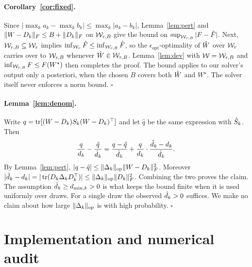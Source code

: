 \paragraph{Corollary~\ref{cor:fixed}.} Since $|\max_ka_k-\max_kb_k|\le\max_k|a_k-b_k|$,
Lemma~\ref{lem:pert} and $\lVert W-D_k\rVert_{F}\le B+\lVert D_k\rVert_{F}$ on $\mathcal{W}_{r,B}$ give the bound on
$\sup_{\mathcal{W}_{r,B}}|F-\hat{F}|$. Next, $\mathcal{W}_{r,B}\subseteq\mathcal{W}_r$ implies $\inf_{\mathcal{W}_r}\hat{F}\le\inf_{\mathcal{W}_{r,B}}\hat{F}$,
so the $\epsilon_{\mathrm{opt}}$-optimality of $\hat{W}$ over $\mathcal{W}_r$ carries over to $\mathcal{W}_{r,B}$ whenever
$\hat{W}\in\mathcal{W}_{r,B}$. Lemma~\ref{lem:dev} with $\mathcal W=\mathcal{W}_{r,B}$ and $\inf_{\mathcal{W}_{r,B}}F\le F(W^\star)$ then
completes the proof. The bound applies to our solver's output only a posteriori, when the chosen
$B$ covers both $\hat{W}$ and $W^\star$. The solver itself never enforces a norm bound.
\hfill$\square$

\paragraph{Lemma~\ref{lem:denom}.} Write $q=\operatorname{tr}[(W-D_k)S_k(W-D_k)^\top]$ and let $\hat q$ be the
same expression with $\hat{S}_k$. Then
\[
\frac{q}{d_k}-\frac{\hat q}{\hat{d}_k}=\frac{q-\hat q}{\hat{d}_k}+\frac{q}{d_k}\cdot
\frac{\hat{d}_k-d_k}{\hat{d}_k}.
\]
By Lemma~\ref{lem:pert}, $|q-\hat q|\le\lVert \Delta_k\rVert_{\mathrm{op}}\lVert W-D_k\rVert_{F}^2$. Moreover
$|\hat{d}_k-d_k|=|\operatorname{tr}(D_k\Delta_kD_k^\top)|\le\lVert \Delta_k\rVert_{\mathrm{op}}\lVert D_k\rVert_{F}^2$. Combining the two
proves the claim. The assumption $\hat{d}_k\ge d_{\min,k}>0$ is what keeps the bound finite when it
is used uniformly over draws. For a single draw the observed $\hat{d}_k>0$ suffices. We make no
claim about how large $\lVert \Delta_k\rVert_{\mathrm{op}}$ is with high probability. \hfill$\square$

\section{Implementation and numerical audit}
\label{app:impl}

